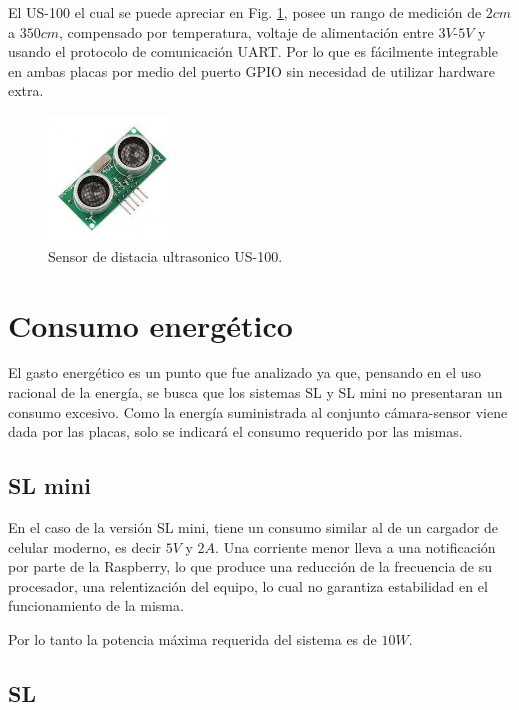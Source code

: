 El US-100 el cual se puede apreciar en Fig. \ref{fig:sensor-US100}, posee un rango de medición de $2cm$ a $350cm$, compensado por temperatura, voltaje de alimentación entre $3V$-$5V$ y usando el protocolo de
comunicación UART.
Por lo que es fácilmente integrable en ambas placas por medio del puerto GPIO sin necesidad de utilizar hardware extra.
\begin{figure}[bth]
    \centering
    \includegraphics[width=0.3\textwidth]{imgs/us-100.jpg}
    \caption{Sensor de distacia ultrasonico US-100.}
    \label{fig:sensor-US100}
\end{figure}

\section{Consumo energético}

El gasto energético es un punto que fue analizado ya que, pensando en el uso racional de la energía, se busca que los sistemas SL y SL mini no presentaran un consumo excesivo.
Como la energía suministrada al conjunto cámara-sensor viene dada por las placas, solo se indicará el consumo requerido por las mismas.


\subsection{SL mini}

En el caso de la versión SL mini, tiene un consumo similar al de un cargador de celular moderno, es decir $5V$ y
$2A$.
Una corriente menor lleva a una notificación por parte de la Raspberry, lo que produce una reducción de la frecuencia de su procesador, una relentización del equipo, lo cual no garantiza estabilidad en el funcionamiento de la misma.

Por lo tanto la potencia máxima requerida del sistema es de $10W$.

\subsection{SL}

